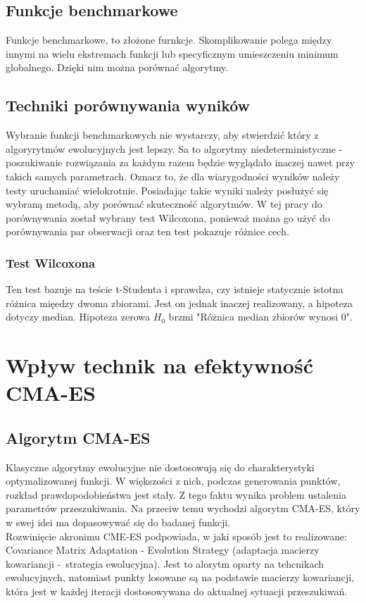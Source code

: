 \documentclass{mini}
\begin{document}
\subsection{Funkcje benchmarkowe}
Funkcje benchmarkowe, to złożone furnkcje. Skomplikowanie polega między innymi na wielu ekstremach funkcji lub specyficznym umieszczeniu minimum globalnego. Dzięki nim można porównać algorytmy.

\subsection{Techniki porównywania wyników}
Wybranie funkcji benchmarkowych nie wystarczy, aby stwierdzić który z algoryrytmów ewolucyjnych jest lepszy. Sa to algorytmy niedeterministyczne - poszukiwanie rozwiązania za każdym razem będzie wyglądało inaczej nawet przy takich samych parametrach. Oznacz to, że dla wiarygodności wyników należy testy uruchamiać wielokrotnie. Posiadając takie wyniki należy posłużyć się wybraną metodą, aby porównać skuteczność algorytmów. W tej pracy do porównywania został wybrany test Wilcoxona, ponieważ można go użyć do porównywania par obserwacji oraz ten test pokazuje różnice cech.

\subsubsection{Test Wilcoxona}
Ten test bazuje na teście t-Studenta i sprawdza, czy istnieje statycznie istotna różnica mięedzy dwoma zbiorami. Jest on jednak inaczej realizowany, a hipoteza dotyczy median. Hipoteza zerowa $H_0$ brzmi "Różnica median zbiorów wynosi 0". \cite{wilcox}

\pagebreak

\section{Wpływ technik na efektywność CMA-ES}

\subsection{Algorytm CMA-ES}
Klasyczne algorytmy ewolucyjne nie dostosowują się do charakterystyki optymalizowanej funkcji. W większości z nich, podczas generowania punktów, rozkład prawdopodobieństwa jest stały. Z tego faktu wynika problem ustalenia parametrów przeszukiwania. Na przeciw temu wychodzi algorytm CMA-ES, który w swej idei ma dopasowywać się do badanej funkcji.\\
Rozwinięcie akronimu CME-ES podpowiada, w jaki sposób jest to realizowane: Covariance Matrix Adaptation - Evolution Strategy (adaptacja macierzy kowariancji -~strategia ewolucyjna). Jest to alorytm oparty na tehcnikach ewolucyjnych, natomiast punkty losowane są na podstawie macierzy kowariancji, która jest w każdej iteracji dostosowywana do aktualnej sytuacji przeszukiwań.
\end{document}

